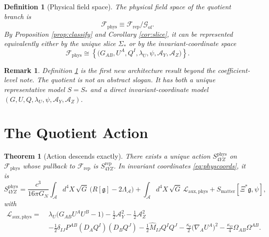 \documentclass[11pt]{article}
\newcommand{\Sub}{\mathcal{A}}
\newcommand{\BridgeMetric}{\mathfrak{g}}
\newcommand{\AY}{\mathcal A_Y}
\newcommand{\AZ}{\mathcal A_Z}
\newcommand{\FieldSpace}{\mathscr F}
\newcommand{\RepFieldSpace}{\FieldSpace_{\mathrm{rep}}}
\newcommand{\PhysFieldSpace}{\FieldSpace_{\mathrm{phys}}}
\newcommand{\GaugeGroup}{\mathscr G_{\mathrm{of}}}
\newcommand{\Slice}{\Sigma_*}
\newtheorem{definition}{Definition}
\newtheorem{remark}{Remark}
\newtheorem{theorem}{Theorem}
\begin{document}
\begin{definition}[Physical field space]
\label{def:physfield}
The physical field space of the quotient branch is
\begin{equation}
\PhysFieldSpace
\equiv
\RepFieldSpace/\GaugeGroup.
\label{eq:physfield}
\end{equation}
By Proposition \ref{prop:classify} and Corollary \ref{cor:slice}, it can be represented equivalently either by the unique slice \(\Slice\) or by the invariant-coordinate space
\begin{equation}
\PhysFieldSpace
\cong
\left\{
\bigl(G_{AB},U^A,Q^I,\lambda_U,\psi,\AY,\AZ\bigr)
\right\}.
\label{eq:physcoords}
\end{equation}
\end{definition}

\begin{remark}
Definition \ref{def:physfield} is the first new architecture result beyond the coefficient-level note. The quotient is not an abstract slogan. It has both a unique representative model \(S=S_*\) and a direct invariant-coordinate model \((G,U,Q,\lambda_U,\psi,\AY,\AZ)\).
\end{remark}

\section{The Quotient Action}

\begin{theorem}[Action descends exactly]
\label{thm:descend}
There exists a unique action \(S_{4YZ}^{\mathrm{phys}}\) on \(\PhysFieldSpace\) whose pullback to \(\RepFieldSpace\) is \(S_{4YZ}^{\mathrm{rep}}\). In invariant coordinates \eqref{eq:physcoords}, it is
\begin{equation}
S_{4YZ}^{\mathrm{phys}}
=
\frac{c^3}{16\pi G_N}
\int_{\Sub} d^4X\,\sqrt{G}\,\bigl(R[\BridgeMetric]-2\Lambda_{\Sub}\bigr)
+\int_{\Sub} d^4X\,\sqrt{G}\,\mathcal L_{\mathrm{aux,phys}}
+S_{\mathrm{matter}}[\Xi^*\BridgeMetric,\psi],
\label{eq:Sphys}
\end{equation}
with
\begin{align}
\mathcal L_{\mathrm{aux,phys}}
=\;&
\lambda_U\bigl(G_{AB}U^AU^B-1\bigr)
-\frac12\AY^2
-\frac12\AZ^2
\nonumber\\
&-\frac12\delta_{IJ}P^{AB}(D_AQ^I)(D_BQ^J)
-\frac12\widehat M_{IJ}Q^IQ^J
-\frac{\kappa_\theta}{2}\bigl(\nabla_AU^A\bigr)^2
-\frac{\kappa_\Omega}{4}\Omega_{AB}\Omega^{AB}.
\label{eq:Lphys}
\end{align}
\end{theorem}
\end{document}
